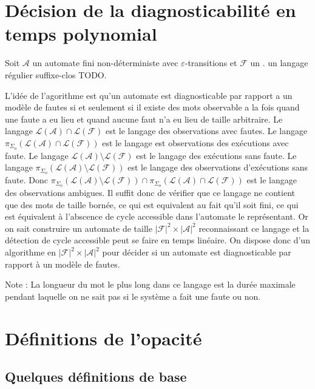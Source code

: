 \documentclass[10pt,a4paper]{article}
\begin{document}
\section{D\'ecision de la diagnosticabilit\'e en temps polynomial}

Soit $\mathcal A$ un automate fini non-d\'eterministe avec $\varepsilon$-transitions et $\mathcal F$ un . un langage r\'egulier suffixe-clos TODO.

L'id\'ee de l'agorithme est qu'un automate est diagnosticable par rapport a un mod\`ele de fautes si et seulement si il existe des mots observable a la fois quand une faute a eu lieu et quand aucune faut n'a eu lieu de taille arbitraire. Le langage $\mathcal L (\mathcal A) \cap \mathcal L(\mathcal F)$ est le langage des observations avec fautes. Le langage $\pi_{\Sigma_o}(\mathcal L (\mathcal A) \cap \mathcal L(\mathcal F))$ est le langage est observations des ex\'ecutions avec faute. Le langage $\mathcal L(\mathcal A) \setminus \mathcal L(\mathcal F)$ est le langage des ex\'ecutions sans faute. Le langage $\pi_{\Sigma_o}(\mathcal L(\mathcal A) \setminus \mathcal L(\mathcal F))$ est le langage des observations d'ex\'ecutions sans faute. Donc $\pi_{\Sigma_o}(\mathcal L(\mathcal A) \setminus \mathcal L(\mathcal F)) \cap \pi_{\Sigma_o}(\mathcal L (\mathcal A) \cap \mathcal L(\mathcal F))$ est le langage des observations ambigues. Il suffit donc de v\'erifier que ce langage ne contient que des mots de taille born\'ee, ce qui est equivalent au fait qu'il soit fini, ce qui est \'equivalent \`a l'abscence de cycle accessible dans l'automate le repr\'esentant. Or on sait construire un automate de taille $|\mathcal F|^2 \times |\mathcal A|^2$ reconnaissant ce langage et la d\'etection de cycle accessible peut se faire en temps lin\'eaire. On dispose donc d'un algorithme en $|\mathcal F|^2 \times |\mathcal A|^2$ pour d\'ecider si un automate est diagnosticable par rapport \`a un mod\`ele de fautes.

Note : La longueur du mot le plus long dans ce langage est la dur\'ee maximale pendant laquelle on ne sait pas si le syst\`eme a fait une faute ou non.


\section{D\'efinitions de l'opacit\'e}

\subsection{Quelques d\'efinitions de base}
\end{document}
